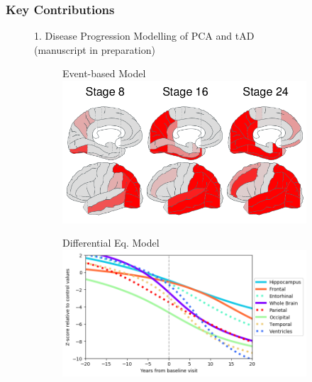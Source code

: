 \documentclass[10pt,xcolor=table]{beamer}
\begin{document}
\begin{frame}
\frametitle{Key Contributions}

\small{

\begin{figure}
\centering

1. Disease Progression Modelling of PCA and tAD\\
\footnotesize{(manuscript in preparation)}

\begin{subfigure}{0.3\textwidth}
\centering
\vspace{1em}
Event-based Model\\
\includegraphics[scale=0.10]{ebm_thumb.png} 
\end{subfigure}
\begin{subfigure}{0.3\textwidth}
\centering
\vspace{1em}
Differential Eq. Model\\
\includegraphics[scale=0.15]{../images/dem/mriSmallSebPaper_DEMStdPCA_trajAlign.png}
\end{subfigure}


\end{figure}}
\end{frame}
\end{document}
